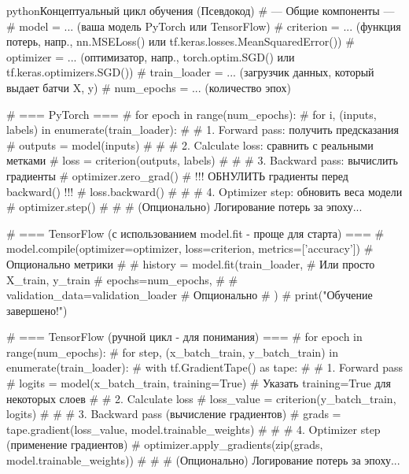 \begin{codebox}{python}{Концептуальный цикл обучения (Псевдокод)}
# --- Общие компоненты ---
# model = ... (ваша модель PyTorch или TensorFlow)
# criterion = ... (функция потерь, напр., nn.MSELoss() или tf.keras.losses.MeanSquaredError())
# optimizer = ... (оптимизатор, напр., torch.optim.SGD() или tf.keras.optimizers.SGD())
# train_loader = ... (загрузчик данных, который выдает батчи X, y)
# num_epochs = ... (количество эпох)

# === PyTorch ===
# for epoch in range(num_epochs):
#     for i, (inputs, labels) in enumerate(train_loader):
#         # 1. Forward pass: получить предсказания
#         outputs = model(inputs)
#
#         # 2. Calculate loss: сравнить с реальными метками
#         loss = criterion(outputs, labels)
#
#         # 3. Backward pass: вычислить градиенты
#         optimizer.zero_grad() # !!! ОБНУЛИТЬ градиенты перед backward() !!!
#         loss.backward()
#
#         # 4. Optimizer step: обновить веса модели
#         optimizer.step()
#
#     # (Опционально) Логирование потерь за эпоху...

# === TensorFlow (с использованием model.fit - проще для старта) ===
# model.compile(optimizer=optimizer, loss=criterion, metrics=['accuracy']) # Опционально метрики
#
# history = model.fit(train_loader, # Или просто X_train, y_train
#                     epochs=num_epochs,
#                     # validation_data=validation_loader # Опционально
#                    )
# print("Обучение завершено!")

# === TensorFlow (ручной цикл - для понимания) ===
# for epoch in range(num_epochs):
#     for step, (x_batch_train, y_batch_train) in enumerate(train_loader):
#         with tf.GradientTape() as tape:
#             # 1. Forward pass
#             logits = model(x_batch_train, training=True) # Указать training=True для некоторых слоев
#             # 2. Calculate loss
#             loss_value = criterion(y_batch_train, logits)
#
#         # 3. Backward pass (вычисление градиентов)
#         grads = tape.gradient(loss_value, model.trainable_weights)
#
#         # 4. Optimizer step (применение градиентов)
#         optimizer.apply_gradients(zip(grads, model.trainable_weights))
#
#     # (Опционально) Логирование потерь за эпоху...
\end{codebox}
